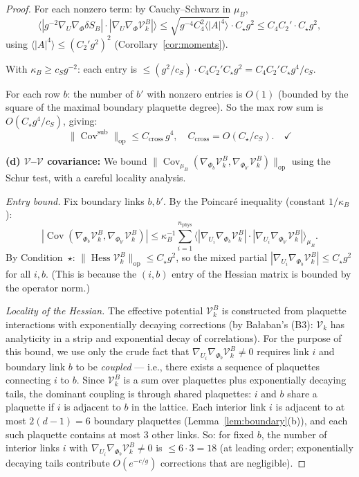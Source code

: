 \documentclass[11pt,a4paper]{article}
\theoremstyle{plain}
\theoremstyle{definition}
\theoremstyle{remark}
\newcommand{\Cov}{\operatorname{Cov}}
\newcommand{\Hess}{\operatorname{Hess}}
\newcommand{\cV}{\mathcal{V}}
\begin{document}
\begin{proof}
For each nonzero term: by Cauchy--Schwarz in $\mu_B$,
\begin{equation}
  \langle|g^{-2}\nabla_U\nabla_\Phi\delta S_B|
  \cdot|\nabla_U\nabla_\Phi\cV_k^B|\rangle
  \le \sqrt{g^{-4}C_4^2\langle|A|^4\rangle}
  \cdot C_\star g^2
  \le C_4 C_2' \cdot C_\star g^2,
\end{equation}
using $\langle|A|^4\rangle \le (C_2' g^2)^2$
(Corollary~\ref{cor:moments}).

With $\kappa_B \ge c_S g^{-2}$: each entry is
$\le (g^2/c_S)\cdot C_4 C_2' C_\star g^2
= C_4 C_2' C_\star g^4 / c_S$.

For each row $b$: the number of $b'$ with nonzero
entries is $O(1)$ (bounded by the square of the
maximal boundary plaquette degree). So the max
row sum is $O(C_\star g^4/c_S)$, giving:
\begin{equation}
  \|\Cov^{\mathrm{sub}}\|_{\mathrm{op}}
  \le C_{\mathrm{cross}}\,g^4, \quad
  C_{\mathrm{cross}} = O(C_\star / c_S).
  \quad\checkmark
\end{equation}

\medskip\noindent
\textbf{(d) $\cV$--$\cV$ covariance:}
We bound $\|\Cov_{\mu_B}(\nabla_{\Phi_b}\cV_k^B,
\nabla_{\Phi_{b'}}\cV_k^B)\|_{\mathrm{op}}$ using the
Schur test, with a careful locality analysis.

\emph{Entry bound.} Fix boundary links $b, b'$. By the
Poincar\'e inequality (constant $1/\kappa_B$):
\begin{equation}
  |\Cov(\nabla_{\Phi_b}\cV_k^B,
  \nabla_{\Phi_{b'}}\cV_k^B)|
  \le \kappa_B^{-1} \sum_{i=1}^{n_{\mathrm{phys}}}
  \langle|\nabla_{U_i}\nabla_{\Phi_b}\cV_k^B|
  \cdot|\nabla_{U_i}\nabla_{\Phi_{b'}}\cV_k^B|
  \rangle_{\mu_B}.
\end{equation}
By Condition~$\star$: $\|\Hess\cV_k^B\|_{\mathrm{op}}
\le C_\star g^2$, so the mixed partial
$|\nabla_{U_i}\nabla_{\Phi_b}\cV_k^B| \le C_\star g^2$
for all $i, b$. (This is because the $(i,b)$ entry of
the Hessian matrix is bounded by the operator norm.)

\emph{Locality of the Hessian.} The effective potential
$\cV_k^B$ is constructed from plaquette interactions
with exponentially decaying corrections
(by Ba{\l}aban's (B3): $\cV_k$ has analyticity in a strip
and exponential decay of correlations). For the
purpose of this bound, we use only the crude fact
that $\nabla_{U_i}\nabla_{\Phi_b}\cV_k^B \ne 0$
requires link $i$ and boundary link $b$ to be
\emph{coupled} --- i.e., there exists a sequence of
plaquettes connecting $i$ to $b$. Since $\cV_k^B$
is a sum over plaquettes plus exponentially decaying
tails, the dominant coupling is through shared plaquettes:
$i$ and $b$ share a plaquette if $i$ is adjacent to $b$
in the lattice. Each interior link $i$ is adjacent to
at most $2(d-1) = 6$ boundary plaquettes
(Lemma~\ref{lem:boundary}(b)), and each such plaquette
contains at most $3$ other links. So: for fixed $b$,
the number of interior links $i$ with
$\nabla_{U_i}\nabla_{\Phi_b}\cV_k^B \ne 0$ is
$\le 6 \cdot 3 = 18$ (at leading order; exponentially
decaying tails contribute $O(e^{-c/g})$ corrections
that are negligible).


\end{proof}
\end{document}
